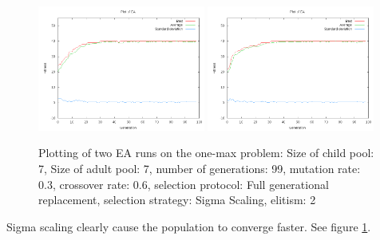 \documentclass[11pt]{article}
\begin{document}
\begin{figure}[ht]
\begin{center}
\mbox{\includegraphics[width=0.49\textwidth]{images/sig1.png}}
\mbox{\includegraphics[width=0.49\textwidth]{images/sig2.png}}
\end{center}
\caption{Plotting of two EA runs on the one-max problem:
Size of child pool: 7,
Size of adult pool: 7,
number of generations: 99,
mutation rate: 0.3,
crossover rate: 0.6,
selection protocol: Full generational replacement,
selection strategy: Sigma Scaling,
elitism: 2}
\label{fig:6}
\end{figure}

Sigma scaling clearly cause the population to converge faster. See figure \ref{fig:6}.
\end{document}
